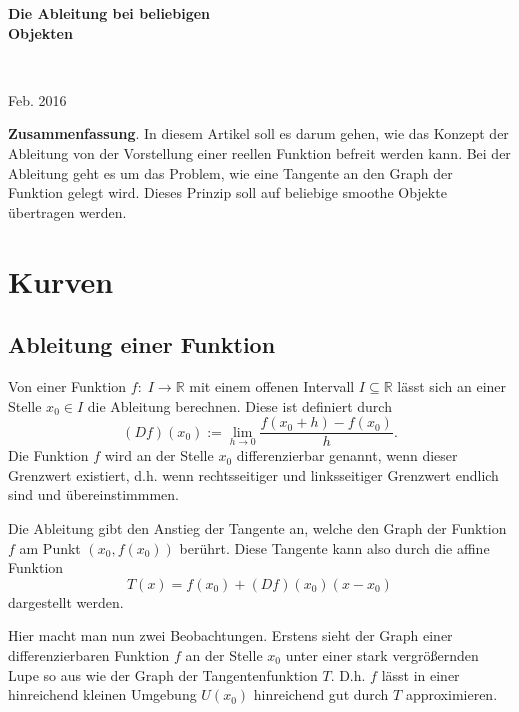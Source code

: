 \documentclass[a4paper,12pt,fleqn]{article}
\begin{document}
\begin{center}
\begin{LARGE}
\noindent
\textbf{Die Ableitung bei beliebigen\\
Objekten}
\end{LARGE}
\\
\vspace{2mm}
\begin{large}
Feb. 2016
\end{large}
\end{center}

\tableofcontents
\vspace{4mm}
\noindent
\textbf{Zusammenfassung}. In diesem Artikel soll es darum gehen,
wie das Konzept der Ableitung von der Vorstellung einer reellen
Funktion befreit werden kann. Bei der Ableitung geht es um das
Problem, wie eine Tangente an den Graph der Funktion gelegt wird.
Dieses Prinzip soll auf beliebige {\glqq}smoothe{\grqq} Objekte
übertragen werden.

\newpage
\section{Kurven}
\subsection{Ableitung einer Funktion}

Von einer Funktion \(f{:}\;I{\rightarrow}\mathbb R\) mit einem
offenen Intervall \(I{\subseteq}\mathbb R\) lässt sich an einer
Stelle \(x_0{\in}I\) die Ableitung berechnen. Diese ist definiert
durch
\begin{equation}
(Df)(x_0) := \lim_{h\rightarrow 0} \frac{f(x_0+h)-f(x_0)}{h}.
\end{equation}
Die Funktion \(f\) wird an der Stelle \(x_0\) differenzierbar genannt,
wenn dieser Grenzwert existiert, d.h. wenn rechtsseitiger und
linksseitiger Grenzwert endlich sind und übereinstimmmen.

Die Ableitung gibt den Anstieg der Tangente an, welche den Graph
der Funktion \(f\) am Punkt \((x_0,f(x_0))\) berührt. Diese
Tangente kann also durch die affine Funktion
\begin{equation}
T(x) = f(x_0)+(Df)(x_0)(x-x_0)
\end{equation}
dargestellt werden.

Hier macht man nun zwei Beobachtungen. Erstens sieht der Graph einer
differenzierbaren Funktion \(f\) an der Stelle \(x_0\) unter einer
stark vergrößernden Lupe so aus wie der Graph der Tangentenfunktion
\(T\). D.h. \(f\) lässt in einer hinreichend kleinen
Umgebung \(U(x_0)\) hinreichend gut durch \(T\) approximieren.
\end{document}

